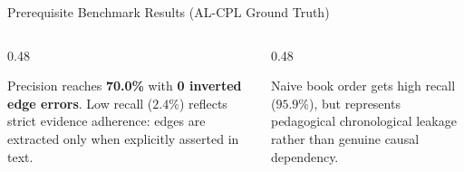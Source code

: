 \documentclass[aspectratio=169,10pt]{beamer}
\begin{document}
\begin{frame}{Prerequisite Benchmark Results (AL-CPL Ground Truth)}
    \begin{columns}[T]
        \begin{column}{0.48\textwidth}
            \begin{tcolorbox}[colback=white,colframe=primaryblue,title=\textbf{High-Precision Conservative Stance},sharp corners]
                \footnotesize Precision reaches \textbf{70.0\%} with \textbf{0 inverted edge errors}. Low recall ($2.4\%$) reflects strict evidence adherence: edges are extracted only when explicitly asserted in text.
            \end{tcolorbox}
        \end{column}
        \begin{column}{0.48\textwidth}
            \begin{tcolorbox}[colback=white,colframe=accentteal,title=\textbf{Book-Order Leakage Control},sharp corners]
                \footnotesize Naive book order gets high recall ($95.9\%$), but represents pedagogical chronological leakage rather than genuine causal dependency.
            \end{tcolorbox}
        \end{column}
    \end{columns}
\end{frame}
\end{document}
